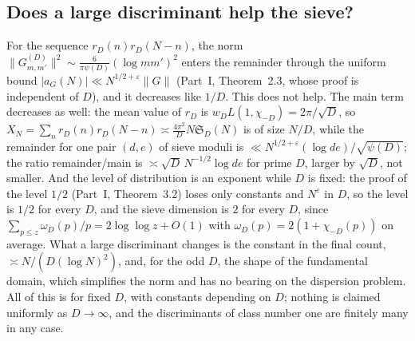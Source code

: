 \documentclass[11pt]{amsart}
\theoremstyle{remark}
\newcommand{\e}{\varepsilon}
\begin{document}
\subsection{Does a large discriminant help the sieve?}\label{subsec:sieve}
For the sequence $r_D(n)r_D(N-n)$, the norm $\|G^{(D)}_{m,m'}\|^2\sim\frac6{\pi\psi(D)}(\log mm')^2$ enters the remainder through the uniform bound $|a_G(N)|\ll N^{1/2+\e}\|G\|$ (Part~I, Theorem~2.3, whose proof is independent of $D$), and it decreases like $1/D$. This does not help. The main term decreases as well: the mean value of $r_D$ is $w_DL(1,\chi_{-D})=2\pi/\sqrt D$, so $X_N=\sum_nr_D(n)r_D(N-n)\asymp\frac{4\pi^2}DN\mathfrak S_D(N)$ is of size $N/D$, while the remainder for one pair $(d,e)$ of sieve moduli is $\ll N^{1/2+\e}(\log de)/\sqrt{\psi(D)}$; the ratio remainder/main is $\asymp\sqrt D\,N^{-1/2}\log de$ for prime $D$, larger by $\sqrt D$, not smaller. And the level of distribution is an exponent while $D$ is fixed: the proof of the level $1/2$ (Part~I, Theorem~3.2) loses only constants and $N^\e$ in $D$, so the level is $1/2$ for every $D$, and the sieve dimension is $2$ for every $D$, since $\sum_{p\le z}\omega_D(p)/p=2\log\log z+O(1)$ with $\omega_D(p)=2(1+\chi_{-D}(p))$ on average. What a large discriminant changes is the constant in the final count, $\asymp N/(D(\log N)^2)$, and, for the odd $D$, the shape of the fundamental domain, which simplifies the norm and has no bearing on the dispersion problem. All of this is for fixed $D$, with constants depending on $D$; nothing is claimed uniformly as $D\to\infty$, and the discriminants of class number one are finitely many in any case.
\end{document}
